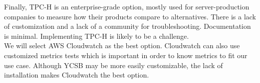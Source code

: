         \noindent Finally, TPC-H is an enterprise-grade option, mostly used for server-production companies to measure how their products compare to alternatives. There is a lack of customization and a lack of a community for troubleshooting. Documentation is minimal. Implementing TPC-H is likely to be a challenge.\\
        
        \noindent We will select AWS Cloudwatch as the best option. Cloudwatch can also use customized metrics tests which is important in order to know metrics to fit our use case. Although YCSB may be more easily customizable, the lack of installation makes Cloudwatch the best option.
